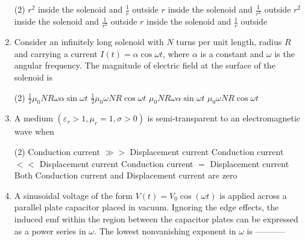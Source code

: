 \begin{enumerate}
{}
 \begin{tasks}(2)
	\task[\textbf{a.}] $r^{2}$ inside the solenoid and $\frac{1}{r}$ outside
	\task[\textbf{b.}]$r$ inside the solenoid and $\frac{1}{r^{2}}$ outside
	\task[\textbf{c.}]$r^{2}$ inside the solenoid and $\frac{1}{r^{2}}$ outside
	\task[\textbf{d.}] $r$ inside the solenoid and $\frac{1}{r}$ outside
\end{tasks}
\item Consider an infinitely long solenoid with $N$ turns per unit length, radius $R$ and carrying a current $I(t)=\alpha \cos \omega t$, where $\alpha$ is a constant and $\omega$ is the angular frequency. The magnitude of electric field at the surface of the solenoid is
 \begin{tasks}(2)
	\task[\textbf{a.}]$\frac{1}{2} \mu_{0} N R \omega \alpha \sin \omega t$
	\task[\textbf{b.}]$\frac{1}{2} \mu_{0} \omega N R \cos \omega t$
	\task[\textbf{c.}]$\mu_{0} N R \omega \alpha \sin \omega t$
	\task[\textbf{d.}] $\mu_{0} \omega N R \cos \omega t$
\end{tasks}
\item A medium $\left(\varepsilon_{r}>1, \mu_{r}=1, \sigma>0\right)$ is semi-transparent to an electromagnetic wave when
{}
 \begin{tasks}(2)
	\task[\textbf{a.}]Conduction current $\gg>$ Displacement current
	\task[\textbf{b.}]Conduction current $<<$ Displacement current
	\task[\textbf{c.}]Conduction current $=$ Displacement current
	\task[\textbf{d.}] Both Conduction current and Displacement current are zero
\end{tasks}
\item A sinusoidal voltage of the form $V(t)=V_{0} \cos (\omega t)$ is applied across a parallel plate capacitor placed in vacuum. Ignoring the edge effects, the induced emf within the region between the capacitor plates can be expressed as a power series in $\omega$. The lowest nonvanishing exponent in $\omega$ is -----------
{}












\end{enumerate}
